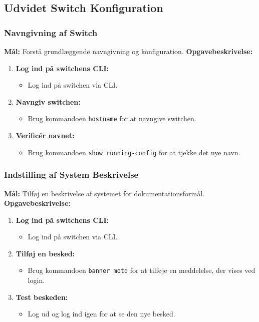 \subsection{Udvidet Switch Konfiguration}
\subsubsection{Navngivning af Switch}
\textbf{Mål:} Forstå grundlæggende navngivning og konfiguration.
\newline\newline\noindent
\textbf{Opgavebeskrivelse:}
\begin{enumerate}
	\item \textbf{Log ind på switchens CLI:}
	\begin{itemize}
		\item Log ind på switchen via CLI.
	\end{itemize}
	\item \textbf{Navngiv switchen:}
	\begin{itemize}
		\item Brug kommandoen \texttt{hostname} for at navngive switchen.
	\end{itemize}
	\item \textbf{Verificér navnet:}
	\begin{itemize}
		\item Brug kommandoen \texttt{show running-config} for at tjekke det nye navn.
	\end{itemize}
\end{enumerate}

\subsubsection*{Indstilling af System Beskrivelse}
\textbf{Mål:} Tilføj en beskrivelse af systemet for dokumentationsformål.
\newline\newline\noindent
\textbf{Opgavebeskrivelse:}
\begin{enumerate}
	\item \textbf{Log ind på switchens CLI:}
	\begin{itemize}
		\item Log ind på switchen via CLI.
	\end{itemize}
	\item \textbf{Tilføj en besked:}
	\begin{itemize}
		\item Brug kommandoen \texttt{banner motd} for at tilføje en meddelelse, der vises ved login.
	\end{itemize}
	\item \textbf{Test beskeden:}
	\begin{itemize}
		\item Log ud og log ind igen for at se den nye besked.
	\end{itemize}
\end{enumerate}

